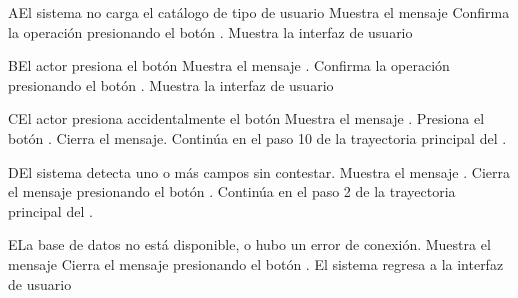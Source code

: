 \begin{UCtrayectoriaA}{A}{El sistema no carga el catálogo de tipo de usuario}
	\UCpaso Muestra el mensaje 
	\UCpaso[\UCactor] Confirma la operación presionando el botón .
	 \UCpaso Muestra la interfaz de usuario 
\end{UCtrayectoriaA}
\begin{UCtrayectoriaA}{B}{El actor presiona el botón }
	\UCpaso Muestra el mensaje .
	\UCpaso[\UCactor] Confirma la operación presionando el botón .
	\UCpaso Muestra la interfaz de usuario 
\end{UCtrayectoriaA}
\begin{UCtrayectoriaA}{C}{El actor presiona accidentalmente el botón }
	\UCpaso Muestra el mensaje .
	\UCpaso[\UCactor] Presiona el botón .
	\UCpaso Cierra el mensaje.
	\UCpaso Continúa en el paso 10 de la trayectoria principal del .
\end{UCtrayectoriaA}
\begin{UCtrayectoriaA}{D}{El sistema detecta uno o más campos sin contestar.}
	\UCpaso Muestra el mensaje .
	\UCpaso[\UCactor] Cierra el mensaje presionando el botón .
	\UCpaso Continúa en el paso 2 de la trayectoria principal del .
\end{UCtrayectoriaA}

\begin{UCtrayectoriaA}{E}{La base de datos no está disponible, o hubo un error de conexión.}
	\UCpaso Muestra el mensaje 
	\UCpaso[\UCactor] Cierra el mensaje presionando el botón .
	\UCpaso El sistema regresa a la interfaz de usuario
\end{UCtrayectoriaA}